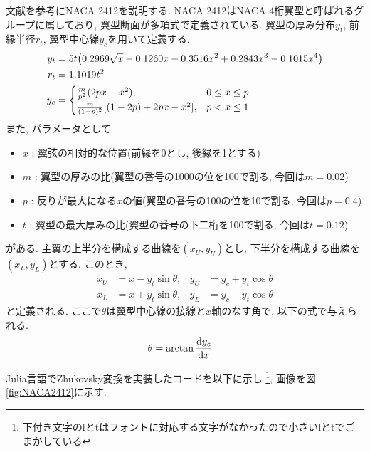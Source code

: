 \documentclass{ltjsarticle}
\begin{document}
文献\cite{Rinoie2011}を参考にNACA 2412を説明する.
NACA 2412はNACA 4桁翼型と呼ばれるグループに属しており, 翼型断面が多項式で定義されている.
翼型の厚み分布$y_t$, 前縁半径$r_t$, 翼型中心線$y_c$を用いて定義する.
\begin{align}
    y_t &= 5t \qty(0.2969 \sqrt{x} - 0.1260 x - 0.3516 x^2 + 0.2843 x^3 - 0.1015 x^4) \\
    r_t &= 1.1019t^2 \\
    y_c &=
    \begin{cases}
        \frac{m}{p^2}(2px-x^2),& 0\leq x\leq p\\
        \frac{m}{(1-p)^2}[(1-2p)+2px-x^2],& p< x\leq 1
    \end{cases}
\end{align}
また, パラメータとして
\begin{itemize}
    \item $x$ : 翼弦の相対的な位置(前縁を0とし, 後縁を1とする)
    \item $m$ : 翼型の厚みの比(翼型の番号の1000の位を100で割る, 今回は$m=0.02$)
    \item $p$ : 反りが最大になる$x$の値(翼型の番号の100の位を10で割る, 今回は$p=0.4$)
    \item $t$ : 翼型の最大厚みの比(翼型の番号の下二桁を100で割る, 今回は$t=0.12$)
\end{itemize}
がある.
主翼の上半分を構成する曲線を$(x_U,y_U)$とし, 下半分を構成する曲線を$(x_L,y_L)$とする.
このとき,
\begin{align}
    x_U &= x-y_t\sin{\theta},&y_U &= y_c+y_t\cos{\theta}\\
    x_L &= x+y_t\sin{\theta},&y_L &= y_c-y_t\cos{\theta}
\end{align}
と定義される\cite{Abbott1945}.
ここで$\theta$は翼型中心線の接線と$x$軸のなす角で, 以下の式で与えられる.
\begin{align}
    \theta &= \arctan{\dv{y_c}{x}}
\end{align}

Julia言語でZhukovsky変換を実装したコードを以下に示し
\footnote{下付き文字のlとtはフォントに対応する文字がなかったので小さいlとtでごまかしている}, 
画像を図\ref{fig:NACA2412}に示す.
\end{document}
